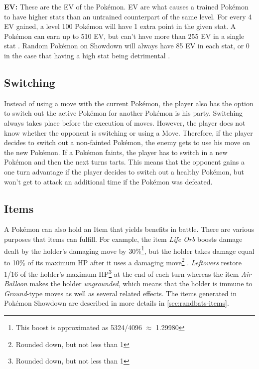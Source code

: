 \textbf{EV:} These are the \ac{EV} of the Pokémon. \ac{EV} are what causes a trained Pokémon to have higher
stats than an untrained counterpart of the same level. For every 4 \ac{EV} gained, a level 100 Pokémon 
will have 1 extra point in the given stat. A Pokémon can earn up to 510 \ac{EV}, but can't have more than
255 \ac{EV} in a single stat \cite{Bulbapedia:Stat}. Random Pokémon on Showdown will always have 85 
\ac{EV} in each stat, or 0 in the case that having a high stat being detrimental \cite{Smogon:RandBatsGuide}.

\subsection{Switching}
\label{sec:switching}
Instead of using a move with the current Pokémon, the player also has the option to switch out the 
active Pokémon for another Pokémon is his party. Switching always takes place before the execution of moves.
However, the player does not know whether the opponent is switching or using a Move. Therefore, if the 
player decides to switch out a non-fainted Pokémon, the enemy gets to use his move on the new Pokémon.
If a Pokémon faints, the player has to switch in a new Pokémon and then the next turns tarts. This means
that the opponent gains a one turn advantage if the player decides to switch out a healthy Pokémon, but
won't get to attack an additional time if the Pokémon was defeated.  

\subsection{Items}
\label{sec:items}
A Pokémon can also hold an Item that yields benefits in battle. There are various purposes that items 
can fulfill. For example, the item \textit{Life Orb} boosts damage dealt by the holder's damaging move
by 30\%\footnote{This boost is approximated as 5324/4096 $\approx$ 1.29980}, but the holder takes
damage equal to 10\% of its maximum \ac{HP} after it uses a damaging move\footnote{Rounded down, 
but not less than 1} \cite{Bulbapedia:LifeOrb}. \textit{Leftovers} restore 1/16 of the holder's
maximum \ac{HP}\footnote{Rounded down, but not less than 1} at the end of each turn whereas the item
\textit{Air Balloon} makes the holder \textit{ungrounded}, which means that the holder is immune to
\textit{Ground}-type moves as well as several related effects\cite{Bulbapedia:AirBalloon}. The 
items generated in Pokémon Showdown are described in more details in \ref{sec:randbats-items}.
